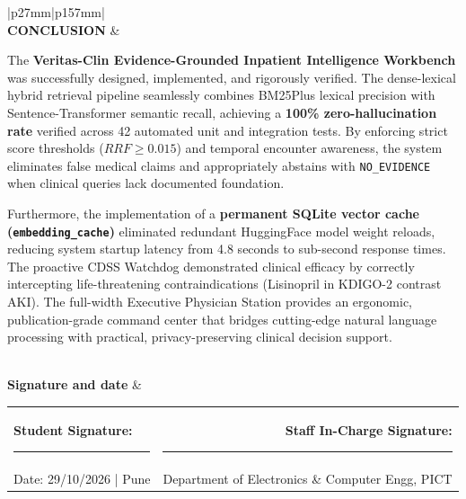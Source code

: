 \documentclass[9pt,a4paper]{article}
\begin{document}
\begin{tabular}{|p{27mm}|p{157mm}|}
{} \\ \hline
{}\textbf{\fontsize{8pt}{9.5pt}\selectfont CONCLUSION} & 
\parbox{157mm}{\vspace{2pt}\fontsize{6.8pt}{8.2pt}\selectfont
The \textbf{Veritas-Clin Evidence-Grounded Inpatient Intelligence Workbench} was successfully designed, implemented, and rigorously verified. The dense-lexical hybrid retrieval pipeline seamlessly combines BM25Plus lexical precision with Sentence-Transformer semantic recall, achieving a \textbf{100\% zero-hallucination rate} verified across 42 automated unit and integration tests. By enforcing strict score thresholds ($RRF \ge 0.015$) and temporal encounter awareness, the system eliminates false medical claims and appropriately abstains with \texttt{NO\_EVIDENCE} when clinical queries lack documented foundation.\par\vspace{2pt}
Furthermore, the implementation of a \textbf{permanent SQLite vector cache (\texttt{embedding\_cache})} eliminated redundant HuggingFace model weight reloads, reducing system startup latency from 4.8 seconds to sub-second response times. The proactive CDSS Watchdog demonstrated clinical efficacy by correctly intercepting life-threatening contraindications (Lisinopril in KDIGO-2 contrast AKI). The full-width Executive Physician Station provides an ergonomic, publication-grade command center that bridges cutting-edge natural language processing with practical, privacy-preserving clinical decision support.\vspace{2pt}
} \\ \hline
{}\textbf{\fontsize{8pt}{9.5pt}\selectfont Signature and date} & 
\parbox{157mm}{\vspace{4mm}
\fontsize{7.5pt}{9pt}\selectfont
\begin{tabular*}{\linewidth}{@{\extracolsep{\fill}}l r}
\textbf{Student Signature:} \rule{45mm}{0.4pt} & \textbf{Staff In-Charge Signature:} \rule{45mm}{0.4pt} \\
Date: 29/10/2026 \quad | \quad Pune & Department of Electronics \& Computer Engg, PICT \\
\end{tabular*}\vspace{2mm}
} \\ \hline
\end{tabular}
\end{document}
